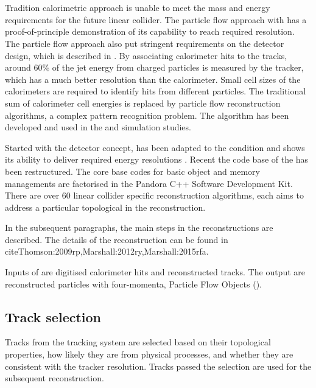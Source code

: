 \section{\pandora}

Tradition calorimetric approach is unable to meet the mass and energy requirements for the future linear collider. The particle flow approach with \pandora has a proof-of-principle demonstration of its capability to reach required resolution. The particle flow approach also put stringent requirements on the detector design, which is described in . By associating calorimeter hits to the tracks, around 60\% of the jet energy from charged particles is measured by the tracker, which has a much better resolution than the calorimeter. Small cell sizes of the calorimeters are required to identify hits from different particles. The traditional sum of calorimeter cell energies is replaced by particle flow reconstruction algorithms, a complex pattern recognition problem.  The \pandora algorithm has been developed and used in the \ILC and \CLIC simulation studies. 

Started with the \ILD detector concept, \pandora has been adapted to the \CLIC condition and shows its ability to deliver required energy resolutions \cite{Linssen:2012hp}. Recent the code base of the \pandora has been restructured. The core base codes for basic object and memory managements are factorised in the Pandora C++ Software Development Kit\cite{Marshall:2015rfa}. There are over 60 linear collider specific reconstruction algorithms, each aims to address a particular topological in the reconstruction. 

In the subsequent paragraphs, the main steps in the \pandora reconstructions are described. The details of the reconstruction can be found in cite{Thomson:2009rp,Marshall:2012ry,Marshall:2015rfa}.

Inputs of \pandora are digitised calorimeter hits and reconstructed tracks. The output are reconstructed particles with four-momenta, Particle Flow Objects (\PFOs).

\subsection{Track selection}

Tracks from the tracking system are selected based on their topological properties, how likely they are from physical processes, and whether they are consistent with the tracker resolution. Tracks passed the selection are used for the subsequent reconstruction.

